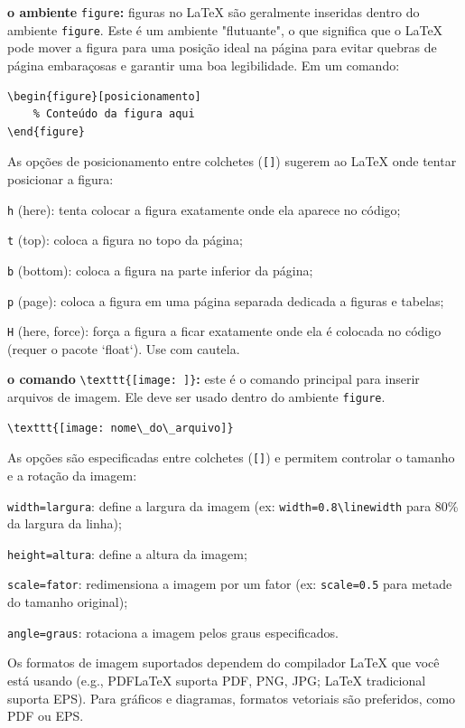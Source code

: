 \begin{alineas}
	\item \textbf{o ambiente} \texttt{figure}\textbf{:} figuras no LaTeX são geralmente inseridas dentro do ambiente \texttt{figure}. Este é um ambiente "flutuante", o que significa que o LaTeX pode mover a figura para uma posição ideal na página para evitar quebras de página embaraçosas e garantir uma boa legibilidade. Em um comando:
	\begin{lstlisting}[language={[LaTeX]TeX}]
\begin{figure}[posicionamento]
	% Conteúdo da figura aqui
\end{figure}
	\end{lstlisting}
	As opções de posicionamento entre colchetes (\texttt{[]}) sugerem ao LaTeX onde tentar posicionar a figura:
	\begin{alineas}
		\item \texttt{h} (here): tenta colocar a figura exatamente onde ela aparece no código;
		\item \texttt{t} (top): coloca a figura no topo da página;
		\item \texttt{b} (bottom): coloca a figura na parte inferior da página;
		\item \texttt{p} (page): coloca a figura em uma página separada dedicada a figuras e tabelas;
		\item \texttt{H} (here, force): força a figura a ficar exatamente onde ela é colocada no código (requer o pacote `float`). Use com cautela.
	\end{alineas}
	
	\item \textbf{o comando} \verb|\texttt{[image: ]}|\textbf{:} este é o comando principal para inserir arquivos de imagem. Ele deve ser usado dentro do ambiente \texttt{figure}.
	\begin{lstlisting}[language={[LaTeX]TeX}]
\texttt{[image: nome\_do\_arquivo]}
	\end{lstlisting}
	As opções são especificadas entre colchetes (\texttt{[]}) e permitem controlar o tamanho e a rotação da imagem:
	\begin{alineas}
		\item \texttt{width=largura}: define a largura da imagem (ex: \texttt{width=0.8}\verb|\linewidth| para 80\% da largura da linha);
		\item \texttt{height=altura}: define a altura da imagem;
		\item \texttt{scale=fator}: redimensiona a imagem por um fator (ex: \texttt{scale=0.5} para metade do tamanho original);
		\item \texttt{angle=graus}: rotaciona a imagem pelos graus especificados.
	\end{alineas}
	Os formatos de imagem suportados dependem do compilador LaTeX que você está usando (e.g., PDFLaTeX suporta PDF, PNG, JPG; LaTeX tradicional suporta EPS). Para gráficos e diagramas, formatos vetoriais são preferidos, como PDF ou EPS.
	

\end{alineas}
